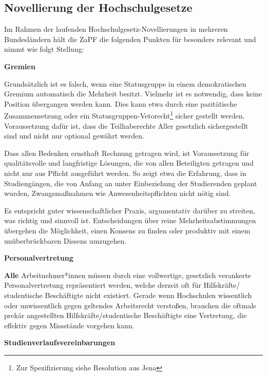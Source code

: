 
\subsection{Novellierung der Hochschulgesetze}

Im Rahmen der laufenden Hochschulgesetz-Novellierungen in mehreren Bundesländern hält die ZaPF die folgenden Punkten für besonders relevant und nimmt wie folgt Stellung:

\textbf{Gremien}

Grundsätzlich ist es falsch, wenn eine Statusgruppe in einem demokratischen Gremium automatisch die Mehrheit besitzt. Vielmehr ist es notwendig, dass keine Position übergangen werden kann. Dies kann etwa durch eine paritätische Zusammensetzung oder ein Statusgruppen-Vetorecht\footnote{Zur Spezifizierung siehe Resolution aus Jena} %
sicher gestellt werden. Voraussetzung dafür ist, dass die Teilhaberechte Aller gesetzlich sichergestellt sind und nicht nur optional gewährt werden.

Dass allen Bedenken ernsthaft Rechnung getragen wird, ist Voraussetzung für qualitätsvolle und langfristige Lösungen, die von allen Beteiligten getragen und nicht nur aus Pflicht ausgeführt werden. So zeigt etwa die Erfahrung, dass in Studiengängen, die von Anfang an unter Einbeziehung der Studierenden geplant wurden, Zwangsmaßnahmen wie Anwesenheitspflichten nicht nötig sind.

Es entspricht guter wissenschaftlicher Praxis, argumentativ darüber zu streiten, was richtig und sinnvoll ist. Entscheidungen über reine Mehrheitsabstimmungen übergehen die Möglichkeit, einen Konsens zu finden oder produktiv mit einem unüberbrückbaren Dissens umzugehen.

\textbf{Personalvertretung}

\textbf{Alle} Arbeitnehmer*innen müssen durch eine vollwertige, gesetzlich verankerte Personalvertretung repräsentiert werden, welche derzeit oft für Hilfskräfte/ studentische Beschäftigte nicht existiert. Gerade wenn Hochschulen wissentlich oder unwissentlich gegen geltendes Arbeitsrecht verstoßen, brauchen die oftmals prekär angestellten Hilfskräfte/studentische Beschäftigte eine Vertretung, die effektiv gegen Missstände vorgehen kann.

\textbf{Studienverlaufsvereinbarungen}

